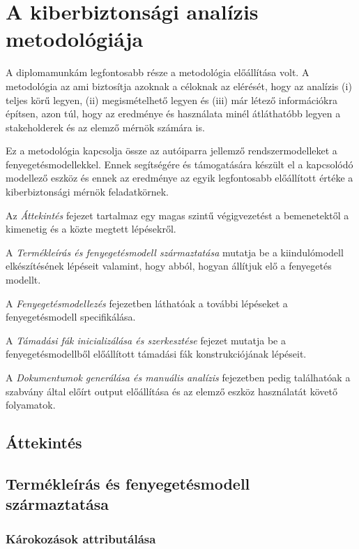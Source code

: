 \chapter{A kiberbiztonsági analízis metodológiája}

A diplomamunkám legfontosabb része a metodológia előállítása volt. A metodológia az ami biztosítja azoknak a céloknak az elérését, hogy az analízis (i) teljes körű legyen, (ii) megismételhető legyen és (iii) már létező információkra építsen, azon túl, hogy az eredménye és használata minél átláthatóbb legyen a stakeholderek és az elemző mérnök számára is.

Ez a metodológia kapcsolja össze az autóiparra jellemző rendszermodelleket a fenyegetésmodellekkel. Ennek segítségére és támogatására készült el a kapcsolódó modellező eszköz és ennek az eredménye az egyik legfontosabb előállított értéke a kiberbiztonsági mérnök feladatkörnek.

Az \textit{Áttekintés} fejezet tartalmaz egy magas szintű végigvezetést a bemenetektől a kimenetig és a közte megtett lépésekről.

A \textit{Termékleírás és fenyegetésmodell származtatása} mutatja be a kiindulómodell elkészítésének lépéseit valamint, hogy abból, hogyan állítjuk elő a fenyegetés modellt.

A \textit{Fenyegetésmodellezés} fejezetben láthatóak a további lépéseket a fenyegetésmodell specifikálása.

A \textit{Támadási fák inicializálása és szerkesztése} fejezet mutatja be a fenyegetésmodellből előállított támadási fák konstrukciójának lépéseit.

A \textit{Dokumentumok generálása és manuális analízis} fejezetben pedig találhatóak a szabvány által előírt output előállítása és az elemző eszköz használatát követő folyamatok.

\section{Áttekintés}



\section{Termékleírás és fenyegetésmodell származtatása}

\subsection{Károkozások attributálása}

